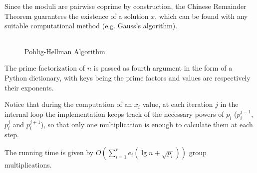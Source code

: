 \documentclass[UTF8]{article}
\begin{document}
Since the moduli are pairwise coprime by construction, the Chinese Remainder Theorem guarantees the existence of a solution $x$, which can be found with any suitable computational method (e.g. Gauss's algorithm).

\begin{figure}[H]
    \centering
    \caption{Pohlig-Hellman Algorithm}
    \begin{tabular}{c}
        
    \end{tabular}
\end{figure}

The prime factorization of $n$ is passed as fourth argument in the form of a Python dictionary, with keys being the prime factors and values are respectively their exponents.

Notice that during the computation of an $x_i$ value, at each iteration $j$ in the internal loop the implementation keeps track of the necessary powers of $p_i$ ($p_i^{j-1}$, $p_i^j$ and $p_i^{j+1}$), so that only one multiplication is enough to calculate them at each step.

The running time is given by $O(\sum_{i=1}^{r}e_i(\lg n + \sqrt{p_i}))$ group multiplications.
\end{document}
